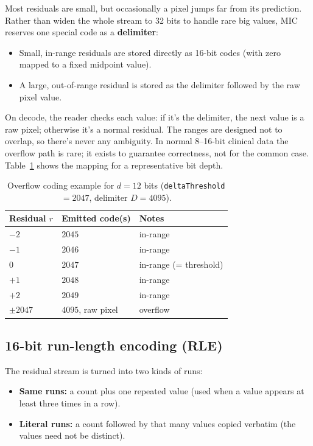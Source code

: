 \documentclass[11pt]{article}
\begin{document}
Most residuals are small, but occasionally a pixel jumps far from its
prediction. Rather than widen the whole stream to 32 bits to handle rare big
values, MIC reserves one special code as a \textbf{delimiter}:

\begin{itemize}
  \item Small, in-range residuals are stored directly as 16-bit codes (with
  zero mapped to a fixed midpoint value).
  \item A large, out-of-range residual is stored as the delimiter followed by
  the raw pixel value.
\end{itemize}

On decode, the reader checks each value: if it's the delimiter, the next
value is a raw pixel; otherwise it's a normal residual. The ranges are
designed not to overlap, so there's never any ambiguity. In normal 8--16-bit
clinical data the overflow path is rare; it exists to guarantee correctness,
not for the common case. Table~\ref{tab:overflow-map} shows the mapping for a
representative bit depth.

\begin{table}[htbp]
\centering
\caption{Overflow coding example for $d=12$ bits
(\texttt{deltaThreshold}$=2047$, delimiter $D=4095$).}
\label{tab:overflow-map}
\begin{tabular}{lll}
\toprule
Residual $r$ & Emitted code(s) & Notes \\
\midrule
$-2$ & $2045$ & in-range \\
$-1$ & $2046$ & in-range \\
$0$  & $2047$ & in-range (= threshold) \\
$+1$ & $2048$ & in-range \\
$+2$ & $2049$ & in-range \\
$\pm 2047$ & $4095$, raw pixel & overflow \\
\bottomrule
\end{tabular}
\end{table}

\subsection{16-bit run-length encoding (RLE)}

The residual stream is turned into two kinds of runs:

\begin{itemize}
  \item \textbf{Same runs:} a count plus one repeated value (used when a value
  appears at least three times in a row).
  \item \textbf{Literal runs:} a count followed by that many values copied
  verbatim (the values need not be distinct).
\end{itemize}
\end{document}
